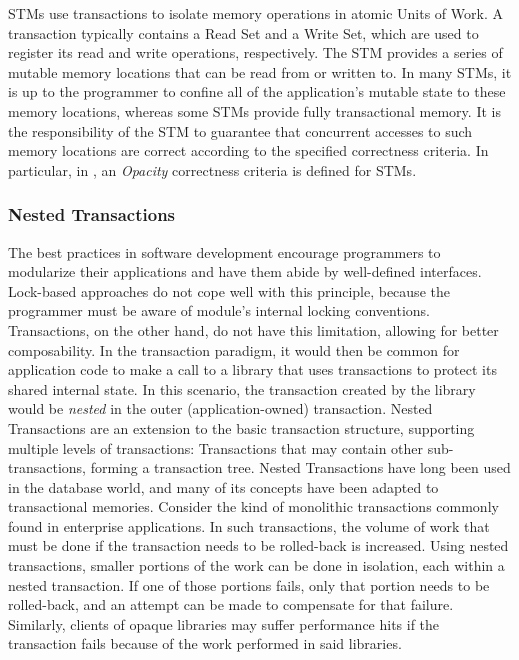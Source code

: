 \documentclass{llncs}
\begin{document}
STMs use transactions to isolate memory operations in atomic Units of
Work. A transaction typically contains a Read Set and a Write Set,
which are used to register its read and write operations,
respectively. The STM provides a series of mutable memory locations
that can be read from or written to. In many STMs, it is up to the
programmer to confine all of the application's mutable state to these
memory locations, whereas some STMs provide fully transactional
memory. It is the responsibility of the STM to guarantee that
concurrent accesses to such memory locations are correct according to
the specified correctness criteria. In particular, in
\cite{guerraoui2008correctness}, an {\it Opacity} correctness criteria
is defined for STMs.

\subsubsection{Nested Transactions}

The best practices in software development encourage programmers to
modularize their applications and have them abide by well-defined
interfaces. Lock-based approaches do not cope well with this
principle, because the programmer must be aware of module's internal
locking conventions. Transactions, on the other hand, do not have this
limitation, allowing for better composability. In the transaction
paradigm, it would then be common for application code to make a call
to a library that uses transactions to protect its shared internal
state. In this scenario, the transaction created by the library would
be {\it nested} in the outer (application-owned) transaction. Nested
Transactions are an extension to the basic transaction structure,
supporting multiple levels of transactions: Transactions that may
contain other sub-transactions, forming a transaction tree. Nested
Transactions have long been used in the database world, and many of
its concepts have been adapted to transactional memories. Consider the
kind of monolithic transactions commonly found in enterprise
applications. In such transactions, the volume of work that must be
done if the transaction needs to be rolled-back is increased. Using
nested transactions, smaller portions of the work can be done in
isolation, each within a nested transaction. If one of those portions
fails, only that portion needs to be rolled-back, and an attempt can
be made to compensate for that failure. Similarly, clients of opaque
libraries may suffer performance hits if the transaction fails because
of the work performed in said libraries.
\end{document}

